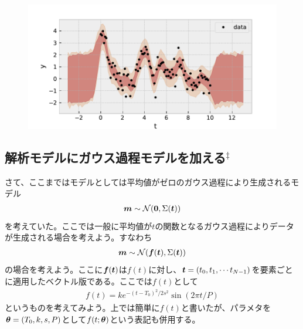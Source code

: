 \begin{figure}[htb]
\begin{center}
\includegraphics[width=\linewidth]{fig/gp/gp6.pdf}
\caption{\label{fig:gp6}}
\end{center}
\end{figure}

\subsection*{解析モデルにガウス過程モデルを加える$^\ddagger$}

さて、ここまではモデルとしては平均値がゼロのガウス過程により生成されるモデル
\begin{align}
\boldsymbol{m} \sim \mathcal{N} ({\bf 0},\Sigma(\boldsymbol{t})) 
\end{align}
を考えていた。ここでは一般に平均値が$t$の関数となるガウス過程によりデータが生成される場合を考えよう。すなわち
\begin{align}
\label{eq:modelgp}
\boldsymbol{m} \sim \mathcal{N} (\boldsymbol{f}(\boldsymbol{t}),\Sigma(\boldsymbol{t})) 
\end{align}
の場合を考えよう。ここに$\boldsymbol{f}(\boldsymbol{t})$は$f(t)$に対し、$\boldsymbol{t}=(t_0,t_1,\cdots t_{N-1})$を要素ごとに適用したベクトル版である。ここでは$f(t)$として
\begin{align}
f(t) = k e^{-(t-T_0)^2/2 s^2} \sin{(2 \pi t/P)}
\end{align}
というものを考えてみよう。上では簡単に$f(t)$と書いたが、パラメタを$\boldsymbol{\theta}=(T_0,k,s,P)$として$f(t;\boldsymbol{\theta})$という表記も併用する。

